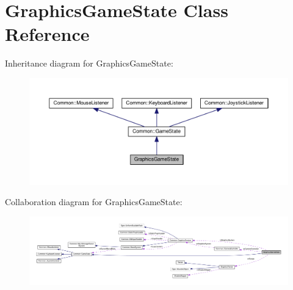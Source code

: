 \hypertarget{class_graphics_game_state}{}\section{Graphics\+Game\+State Class Reference}
\label{class_graphics_game_state}


Inheritance diagram for Graphics\+Game\+State\+:\nopagebreak
\begin{figure}[H]
\begin{center}
\leavevmode
\includegraphics[width=350pt]{class_graphics_game_state__inherit__graph}
\end{center}
\end{figure}


Collaboration diagram for Graphics\+Game\+State\+:\nopagebreak
\begin{figure}[H]
\begin{center}
\leavevmode
\includegraphics[width=350pt]{class_graphics_game_state__coll__graph}
\end{center}
\end{figure}
